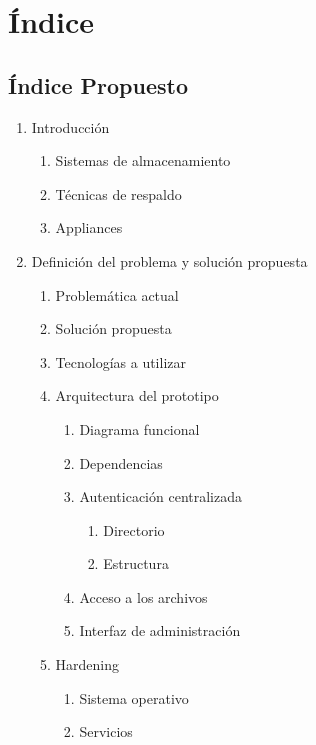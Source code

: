 \chapter{\'{I}ndice}
\label{chap:index}

\section{\'{I}ndice Propuesto}
{
\renewcommand{\labelenumi}{\arabic{enumi}.}
\renewcommand{\labelenumii}{\arabic{enumi}.\arabic{enumii}}
\renewcommand{\labelenumiii}{\arabic{enumi}.\arabic{enumii}.\arabic{enumiii}}
\renewcommand{\labelenumiv}{\arabic{enumi}.\arabic{enumii}.\arabic{enumiii}.\arabic{enumiv}}


\begin{enumerate}
  \item Introducci\'{o}n
  \begin{enumerate}
    \item Sistemas de almacenamiento
    \item T\'{e}cnicas de respaldo
    \item Appliances
  \end{enumerate}
  \item Definici\'{o}n del problema y soluci\'{o}n propuesta
  \begin{enumerate}
    \item Problem\'{a}tica actual
    \item Soluci\'{o}n propuesta
    \item Tecnolog\'{i}as a utilizar
    \item Arquitectura del prototipo
    \begin{enumerate}
      \item Diagrama funcional
      \item Dependencias
      \item Autenticaci\'{o}n centralizada
      \begin{enumerate}
        \item Directorio
        \item Estructura
      \end{enumerate}
      \item Acceso a los archivos
      \item Interfaz de administraci\'{o}n
    \end{enumerate}
    \item Hardening
    \begin{enumerate}
      \item Sistema operativo
      \item Servicios
    \end{enumerate}
  \end{enumerate}
\end{enumerate}
}
